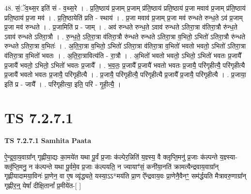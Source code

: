 \documentclass[17pt]{extarticle}
\begin{document}
48. सं॒ॅव॒थ्स॒र इति॑ सं - व॒थ्स॒रे । . प्र॒ति॒ष्ठाय॑ प्र॒जाम् प्र॒जाम् प्र॑ति॒ष्ठाय॑ प्रति॒ष्ठाय॑ प्र॒जा मवाव॑ प्र॒जाम् प्र॑ति॒ष्ठाय॑ प्रति॒ष्ठाय॑ प्र॒जा मव॑ । . प्र॒ति॒ष्ठायेति॑ प्रति - स्थाय॑ । . प्र॒जा मवाव॑ प्र॒जाम् प्र॒जा मव॑ रुन्धते रुन्ध॒ते ऽव॑ प्र॒जाम् प्र॒जा मव॑ रुन्धते । . प्र॒जामिति॑ प्र - जाम् । . अव॑ रुन्धते रुन्ध॒ते ऽवाव॑ रुन्धते ऽतिरा॒त्रा व॑तिरा॒त्रौ रु॑न्ध॒ते ऽवाव॑ रुन्धते ऽतिरा॒त्रौ । . रु॒न्ध॒ते॒ ऽति॒रा॒त्रा व॑तिरा॒त्रौ रु॑न्धते रुन्धते ऽतिरा॒त्रा व॒भितो॒ ऽभितो॑ ऽतिरा॒त्रौ रु॑न्धते रुन्धते ऽतिरा॒त्रा व॒भितः॑ । . अ॒ति॒रा॒त्रा व॒भितो॒ ऽभितो॑ ऽतिरा॒त्रा व॑तिरा॒त्रा व॒भितो॑ भवतो भवतो॒ ऽभितो॑ ऽतिरा॒त्रा व॑तिरा॒त्रा व॒भितो॑ भवतः । . अ॒ति॒रा॒त्रावित्य॑ति - रा॒त्रौ । . अ॒भितो॑ भवतो भवतो॒ ऽभितो॒ ऽभितो॑ भवतः प्र॒जायै᳚ प्र॒जायै॑ भवतो॒ ऽभितो॒ ऽभितो॑ भवतः प्र॒जायै᳚ । . भ॒व॒तः॒ प्र॒जायै᳚ प्र॒जायै॑ भवतो भवतः प्र॒जायै॒ परि॑गृहीत्यै॒ परि॑गृहीत्यै प्र॒जायै॑ भवतो भवतः प्र॒जायै॒ परि॑गृहीत्यै । . प्र॒जायै॒ परि॑गृहीत्यै॒ परि॑गृहीत्यै प्र॒जायै᳚ प्र॒जायै॒ परि॑गृहीत्यै । . प्र॒जाया॒ इति॑ प्र - जायै᳚ । . परि॑गृहीत्या॒ इति॒ परि॑ - गृ॒ही॒त्यै॒ । \newline
\pagebreak
{}

\section{ TS 7.2.7.1 }

\textbf{TS 7.2.7.1 } \newline
\textbf{Samhita Paata} \newline

ऐ॒न्द्र॒वा॒य॒वाग्रा᳚न् गृह्णीया॒द्यः का॒मये॑त यथा पू॒र्वं प्र॒जाः क॑ल्पेर॒न्निति॑ य॒ज्ञ्स्य॒ वै क्लृप्ति॒मनु॑ प्र॒जाः क॑ल्पन्ते य॒ज्ञ्स्या-क्लृ॑प्ति॒मनु॒ न क॑ल्पन्ते यथा पू॒र्वमे॒व प्र॒जाः क॑ल्पयति॒ न ज्यायाꣳ॑सं॒ कनी॑या॒नति॑ क्रामत्यैन्द्रवाय॒वाग्रा᳚न् गृह्णीयादामया॒विनः॑ प्रा॒णेन॒ वा ए॒ष व्यृ॑द्ध्यते॒ यस्या॒ऽऽ*मय॑ति प्रा॒ण ऐ᳚न्द्रवाय॒वः प्रा॒णेनै॒वैनꣳ॒॒ सम॑र्द्धयति मैत्रावरु॒णाग्रा᳚न् गृह्णीर॒न्॒ येषां᳚ दीक्षि॒तानां᳚ प्र॒मीये॑त-[  ] \newline
\end{document}
